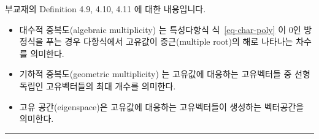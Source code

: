 \documentclass[
  11pt,
  a4paper,
  oneside]{scrbook}
\theoremstyle{definition}
\theoremstyle{plain}
\theoremstyle{definition}
\theoremstyle{definition}
\theoremstyle{remark}
\begin{document}
부교재의 Definition 4.9, 4.10, 4.11 에 대한 내용입니다.

\begin{itemize}
\item
  대수적 중복도(algebraic multiplicity) 는 특성다항식
  식~\ref{eq-char-poly} 이 0인 방정식을 푸는 경우 다항식에서 고유값이
  중근(multiple root)의 해로 나타나는 차수를 의미한다.
\item
  기하적 중복도(geometric multiplicity) 는 고유값에 대응하는 고유벡터들
  중 선형독립인 고유벡터들의 최대 개수를 의미한다.
\item
  고유 공간(eigenspace)은 고유값에 대응하는 고유벡터들이 생성하는
  벡터공간을 의미한다.
\end{itemize}

\begin{center}\rule{0.5\linewidth}{0.5pt}\end{center}
\end{document}
